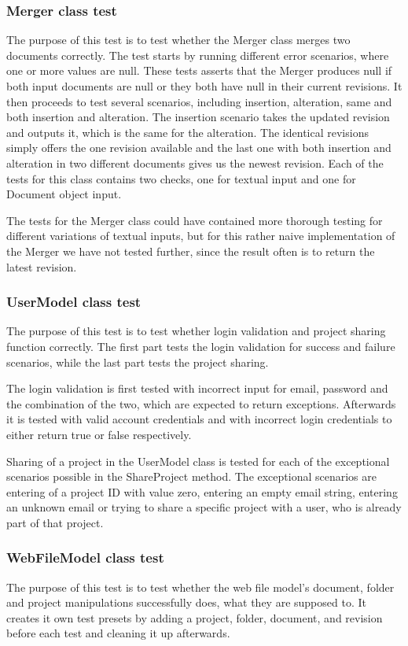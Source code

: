 \subsubsection{Merger class test}
The purpose of this test is to test whether the Merger class merges two documents correctly. The test starts by running different error scenarios, where one or more values are null. These tests asserts that the Merger produces null if both input documents are null or they both have null in their current revisions.
It then proceeds to test several scenarios, including insertion, alteration, same and both insertion and alteration. The insertion scenario takes the updated revision and outputs it, which is the same for the alteration. The identical revisions simply offers the one revision available and the last one with both insertion and alteration in two different documents gives us the newest revision. Each of the tests for this class contains two checks, one for textual input and one for Document object input.

The tests for the Merger class could have contained more thorough testing for different variations of textual inputs, but for this rather naive implementation of the Merger we have not tested further, since the result often is to return the latest revision.

\subsubsection{UserModel class test}
The purpose of this test is to test whether login validation and project sharing function correctly. The first part tests the login validation for success and failure scenarios, while the last part tests the project sharing.

The login validation is first tested with incorrect input for email, password and the combination of the two, which are expected to return exceptions. Afterwards it is tested with valid account credentials and with incorrect login credentials to either return true or false respectively.

Sharing of a project in the UserModel class is tested for each of the exceptional scenarios possible in the ShareProject method. The exceptional scenarios are entering of a project ID with value zero, entering an empty email string, entering an unknown email or trying to share a specific project with a user, who is already part of that project.

\subsubsection{WebFileModel class test}
The purpose of this test is to test whether the web file model's document, folder and project manipulations successfully does, what they are supposed to. It creates it own test presets by adding a project, folder, document, and revision before each test and cleaning it up afterwards.

